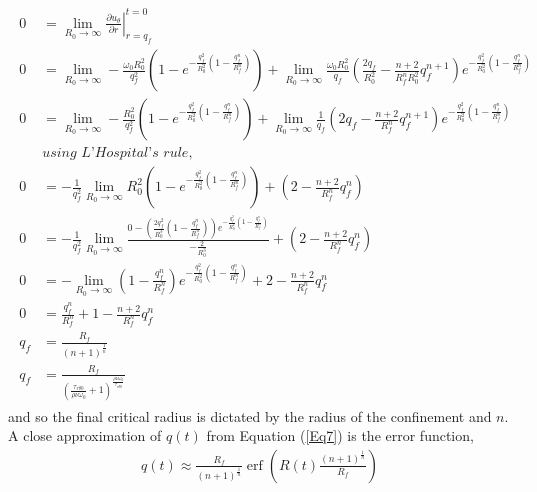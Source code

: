\documentclass{article}
\begin{document}
\begin{align}\label{Eq7}
    \begin{split}
    0&= \displaystyle \lim_{R_0 \to \infty} \left. \frac{\partial u_\theta}{\partial r}\right|_{r=q_f}^{t=0} \\
    0&= \displaystyle \lim_{R_0 \to \infty} -\frac{\omega_0 R_0^2}{q_f^2}\left ( 1-e^{-\frac{q_f^2}{R_0^2}\left ( 1-\frac{q_f^n}{R_f^n} \right)} \right ) +  \displaystyle \lim_{R_0 \to \infty} \frac{\omega_0 R_0^2}{q_f}\left ( \frac{2q_f}{R_0^2}- \frac{n+2}{R_f^n R_0^2}q_f^{n+1} \right )e^{-\frac{q_f^2}{R_0^2}\left ( 1-\frac{q_f^n}{R_f^n} \right)} \\
    0&= \displaystyle \lim_{R_0 \to \infty} -\frac{R_0^2}{q_f^2}\left ( 1-e^{-\frac{q_f^2}{R_0^2}\left ( 1-\frac{q_f^n}{R_f^n} \right)} \right ) +  \displaystyle \lim_{R_0 \to \infty} \frac{1}{q_f}\left ( 2q_f - \frac{n+2}{R_f^n}q_f^{n+1} \right )e^{-\frac{q_f^2}{R_0^2}\left ( 1-\frac{q_f^n}{R_f^n} \right)} \\
    & \textit{using L'Hospital's rule,} \\
    0&= -\frac{1}{q_f^2} \displaystyle \lim_{R_0 \to \infty}  R_0^2\left ( 1-e^{-\frac{q_f^2}{R_0^2}\left ( 1-\frac{q_f^n}{R_f^n} \right)} \right ) +  \left ( 2- \frac{n+2}{R_f^n}q_f^{n} \right ) \\
    0&= -\frac{1}{q_f^2} \displaystyle \lim_{R_0 \to \infty}  \frac{0- \left(\frac{2q_f^2}{R_0^3} \left(1-\frac{q_f^n}{R_f^n} \right) \right) e^{-\frac{q_f^2}{R_0^2}\left ( 1-\frac{q_f^n}{R_f^n} \right)}}{-\frac{2}{R_0^3}} +  \left ( 2- \frac{n+2}{R_f^n}q_f^{n} \right ) \\
    0&= - \displaystyle \lim_{R_0 \to \infty}   \left( 1-\frac{q_f^n}{R_f^n} \right) e^{-\frac{q_f^2}{R_0^2}\left ( 1-\frac{q_f^n}{R_f^n} \right)} +   2- \frac{n+2}{R_f^n}q_f^{n}  \\
    0 &=\frac{q_f^n}{R_f^n}+ 1- \frac{n+2}{R_f^n}q_f^{n} \\
    q_f &= \frac{R_f}{\left( n+1 \right)^\frac{1}{n}} \\
    q_f &= \frac{R_f}{\left( \frac{\tau_{r\theta 0}}{\rho \nu \omega_0}+1 \right)^\frac{\rho \nu \omega_0}{\tau_{r\theta 0}}} 
    \end{split}
\end{align}
and so the final critical radius is dictated by the radius of the confinement and $n$. A close approximation of $q(t)$ from Equation (\ref{Eq7}) is the error function,
\begin{align}\label{Eq8}
    q(t) \approx \frac{R_{f}}{\left(n+1\right)^{\frac{1}{n}}}\operatorname{erf}\left(R\left(t\right)\frac{\left(n+1\right)^{\frac{1}{n}}}{R_{f}}\right)
\end{align}
\end{document}
